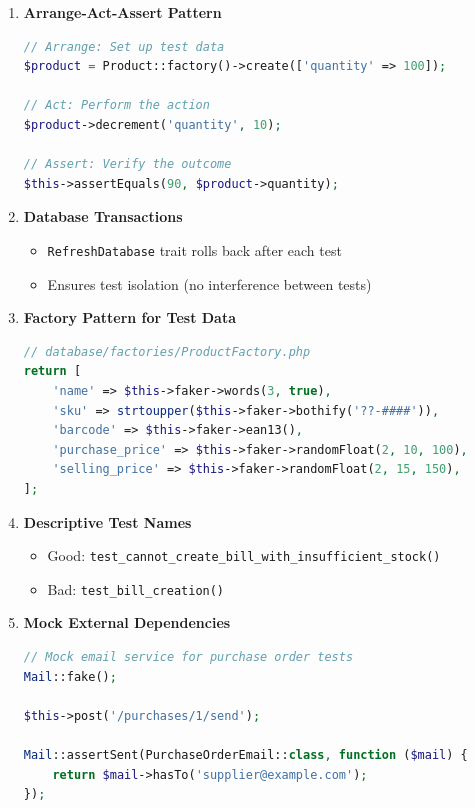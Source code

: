 \begin{enumerate}[leftmargin=*]
    \item \textbf{Arrange-Act-Assert Pattern}
    \begin{lstlisting}[language=PHP]
// Arrange: Set up test data
$product = Product::factory()->create(['quantity' => 100]);

// Act: Perform the action
$product->decrement('quantity', 10);

// Assert: Verify the outcome
$this->assertEquals(90, $product->quantity);
    \end{lstlisting}
    
    \item \textbf{Database Transactions}
    \begin{itemize}
        \item \texttt{RefreshDatabase} trait rolls back after each test
        \item Ensures test isolation (no interference between tests)
    \end{itemize}
    
    \item \textbf{Factory Pattern for Test Data}
    \begin{lstlisting}[language=PHP]
// database/factories/ProductFactory.php
return [
    'name' => $this->faker->words(3, true),
    'sku' => strtoupper($this->faker->bothify('??-####')),
    'barcode' => $this->faker->ean13(),
    'purchase_price' => $this->faker->randomFloat(2, 10, 100),
    'selling_price' => $this->faker->randomFloat(2, 15, 150),
];
    \end{lstlisting}
    
    \item \textbf{Descriptive Test Names}
    \begin{itemize}
        \item Good: \texttt{test\_cannot\_create\_bill\_with\_insufficient\_stock()}
        \item Bad: \texttt{test\_bill\_creation()}
    \end{itemize}
    
    \item \textbf{Mock External Dependencies}
    \begin{lstlisting}[language=PHP]
// Mock email service for purchase order tests
Mail::fake();

$this->post('/purchases/1/send');

Mail::assertSent(PurchaseOrderEmail::class, function ($mail) {
    return $mail->hasTo('supplier@example.com');
});
    \end{lstlisting}
\end{enumerate}

